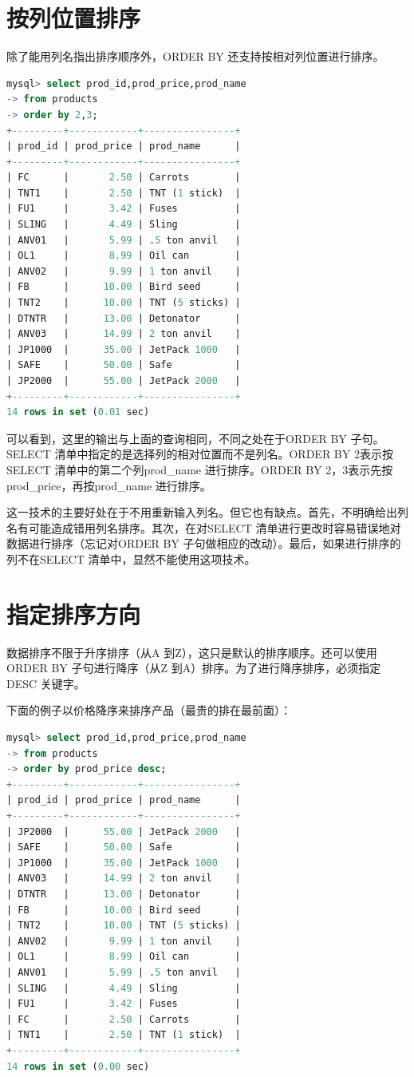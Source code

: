 \documentclass[11pt,a4paper,oneside]{book}
\begin{document}
\section{按列位置排序}
除了能用列名指出排序顺序外，ORDER BY 还支持按相对列位置进行排序。
\begin{lstlisting}[language=sql]
mysql> select prod_id,prod_price,prod_name
-> from products
-> order by 2,3;
+---------+------------+----------------+
| prod_id | prod_price | prod_name      |
+---------+------------+----------------+
| FC      |       2.50 | Carrots        |
| TNT1    |       2.50 | TNT (1 stick)  |
| FU1     |       3.42 | Fuses          |
| SLING   |       4.49 | Sling          |
| ANV01   |       5.99 | .5 ton anvil   |
| OL1     |       8.99 | Oil can        |
| ANV02   |       9.99 | 1 ton anvil    |
| FB      |      10.00 | Bird seed      |
| TNT2    |      10.00 | TNT (5 sticks) |
| DTNTR   |      13.00 | Detonator      |
| ANV03   |      14.99 | 2 ton anvil    |
| JP1000  |      35.00 | JetPack 1000   |
| SAFE    |      50.00 | Safe           |
| JP2000  |      55.00 | JetPack 2000   |
+---------+------------+----------------+
14 rows in set (0.01 sec)
\end{lstlisting}
可以看到，这里的输出与上面的查询相同，不同之处在于ORDER BY 子句。SELECT 清单中指定的是选择列的相对位置而不是列名。ORDER BY 2表示按SELECT 清单中的第二个列prod\_name 进行排序。ORDER BY 2，3表示先按prod\_price，再按prod\_name 进行排序。

这一技术的主要好处在于不用重新输入列名。但它也有缺点。首先，不明确给出列名有可能造成错用列名排序。其次，在对SELECT 清单进行更改时容易错误地对数据进行排序（忘记对ORDER BY 子句做相应的改动）。最后，如果进行排序的列不在SELECT 清单中，显然不能使用这项技术。
\section{指定排序方向}
数据排序不限于升序排序（从A 到Z），这只是默认的排序顺序。还可以使用ORDER BY 子句进行降序（从Z 到A）排序。为了进行降序排序，必须指定DESC 关键字。

下面的例子以价格降序来排序产品（最贵的排在最前面）：

\begin{lstlisting}[language=sql]
mysql> select prod_id,prod_price,prod_name
-> from products
-> order by prod_price desc;
+---------+------------+----------------+
| prod_id | prod_price | prod_name      |
+---------+------------+----------------+
| JP2000  |      55.00 | JetPack 2000   |
| SAFE    |      50.00 | Safe           |
| JP1000  |      35.00 | JetPack 1000   |
| ANV03   |      14.99 | 2 ton anvil    |
| DTNTR   |      13.00 | Detonator      |
| FB      |      10.00 | Bird seed      |
| TNT2    |      10.00 | TNT (5 sticks) |
| ANV02   |       9.99 | 1 ton anvil    |
| OL1     |       8.99 | Oil can        |
| ANV01   |       5.99 | .5 ton anvil   |
| SLING   |       4.49 | Sling          |
| FU1     |       3.42 | Fuses          |
| FC      |       2.50 | Carrots        |
| TNT1    |       2.50 | TNT (1 stick)  |
+---------+------------+----------------+
14 rows in set (0.00 sec)
\end{lstlisting}
\end{document}
